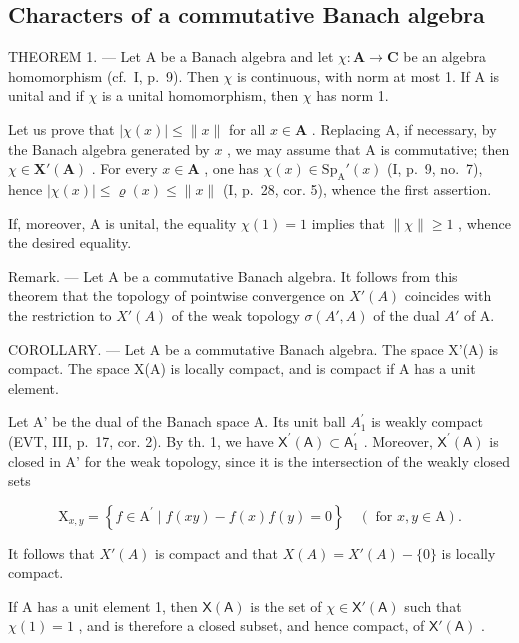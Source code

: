 \subsection{Characters of a commutative Banach algebra}

THEOREM 1. --- Let A be a Banach algebra and let \(\chi\colon\mathbf{A}\to\mathbf{C}\) be an algebra homomorphism (cf.~I, p.~9). Then \(\chi\) is continuous, with norm at most 1. If A is unital and if \(\chi\) is a unital homomorphism, then \(\chi\) has norm 1.

Let us prove that \(|\chi(x)| \leqslant \|x\|\) for all \(x \in \mathbf{A}\) . Replacing A, if necessary, by the Banach algebra generated by \(x\) , we may assume that A is commutative; then \(\chi \in \mathbf{X}'(\mathbf{A})\) . For every \(x \in \mathbf{A}\) , one has \(\chi(x) \in \mathrm{Sp}_{\mathrm{A}}'(x)\) (I, p.~9, no.~7), hence \(|\chi(x)| \leqslant \varrho(x) \leqslant \|x\|\) (I, p.~28, cor. 5), whence the first assertion.

If, moreover, A is unital, the equality \(\chi(1)=1\) implies that \(\|\chi\|\geqslant1\) , whence the desired equality.

Remark. --- Let A be a commutative Banach algebra. It follows from this theorem that the topology of pointwise convergence on \(X'(A)\) coincides with the restriction to \(X'(A)\) of the weak topology \(\sigma(A', A)\) of the dual \(A'\) of A.

COROLLARY. --- Let A be a commutative Banach algebra. The space X'(A) is compact. The space X(A) is locally compact, and is compact if A has a unit element.

Let A' be the dual of the Banach space A. Its unit ball \(A_{1}^{\prime}\) is weakly compact (EVT, III, p.~17, cor. 2). By th. 1, we have \(\mathsf{X}^{\prime}(\mathsf{A}) \subset \mathsf{A}_{1}^{\prime}\) . Moreover, \(\mathsf{X}^{\prime}(\mathsf{A})\) is closed in A' for the weak topology, since it is the intersection of the weakly closed sets

\[
\mathrm{X} _ {x, y} = \left\{f \in \mathrm{A} ^ {\prime} \mid f (x y) - f (x) f (y) = 0 \right\} \quad (\text { for } x, y \in \mathrm{A}).
\]

It follows that \(X'(A)\) is compact and that \(X(A) = X'(A) - \{0\}\) is locally compact.

If A has a unit element 1, then \(\mathsf{X}(\mathsf{A})\) is the set of \(\chi \in \mathsf{X}'(\mathsf{A})\) such that \(\chi(1) = 1\) , and is therefore a closed subset, and hence compact, of \(\mathsf{X}'(\mathsf{A})\) .

